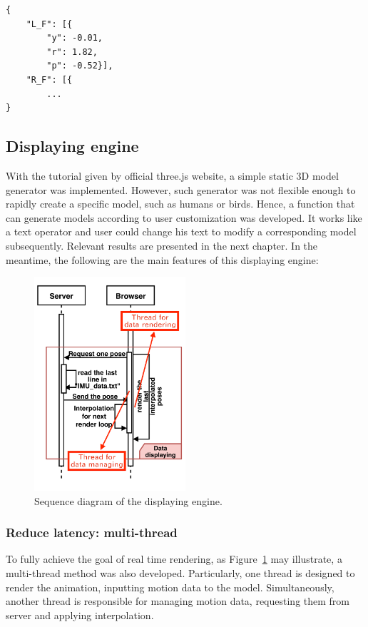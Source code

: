 \lstset{
	language=json,
	numbers=left,
	firstnumber=1
}
\begin{lstlisting}[caption={JSON code sent to front-end client.},label={lst:json}]
{
	"L_F": [{
		"y": -0.01,
		"r": 1.82,
		"p": -0.52}],
	"R_F": [{
		...
}
\end{lstlisting}


\subsection{Displaying engine}

With the tutorial given by official three.js website, a simple static 3D model generator was implemented.
However, such generator was not flexible enough to rapidly create a specific model, such as humans or birds.
Hence, a function that can generate models according to user customization was developed.
It works like a text operator and user could change his text to modify a corresponding model subsequently.
Relevant results are presented in the next chapter.
In the meantime, the following are the main features of this displaying engine:

\begin{figure}[htbp]
	\centering
	\includegraphics[width=0.5\textwidth]{
		fileForWriting/browser_sequence}
	\caption[Sequence diagram of the displaying engine]{Sequence diagram of the displaying engine.}
	\label{fig:browser_sequence}
\end{figure}


\subsubsection{Reduce latency: multi-thread}
To fully achieve the goal of real time rendering, as Figure~\ref{fig:browser_sequence} may illustrate, a multi-thread method was also developed.
Particularly, one thread is designed to render the animation, inputting motion data to the model.
Simultaneously, another thread is responsible for managing motion data, requesting them from server and applying interpolation.

